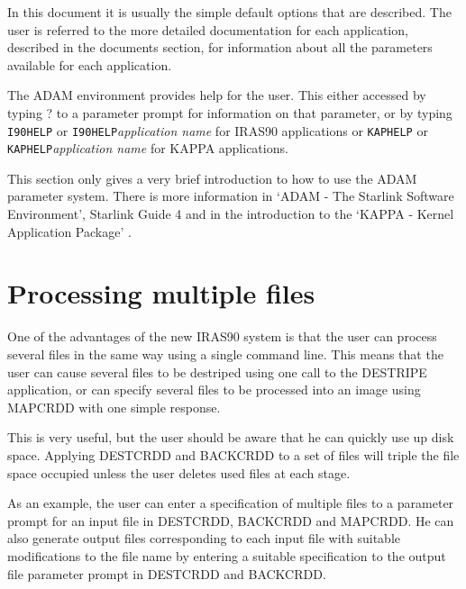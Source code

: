 \documentclass[twoside,11pt]{starlink}
\begin{document}
In this document it is usually the simple default options that are described.
The user is referred to the more detailed documentation for each application,
described in the documents section, for information about all the parameters
available for each application.

The ADAM environment provides help for the user. This either accessed by typing
? to a parameter prompt for information on that parameter, or by typing
\texttt{I90HELP} or \texttt{I90HELP}\textit{application name} for IRAS90 applications or
\texttt{KAPHELP} or \texttt{KAPHELP}\textit{application name} for KAPPA applications.

This section only gives a very brief introduction to how to use the ADAM
parameter system. There is more information in `ADAM - The Starlink Software
Environment', Starlink Guide 4 and in the introduction to the `KAPPA - Kernel
Application Package'
.

\section{Processing multiple files
\label{m:promult}}

One of the advantages of the new IRAS90 system is that the user can process
several  files in the same way using a single command line. This means that
the user can cause several files to be destriped using one call to the DESTRIPE
application, or can specify several files to be processed into an image using
MAPCRDD with one simple response.

This is very useful, but the user should be aware that he can quickly use up
disk space. Applying DESTCRDD and BACKCRDD to a set of files will triple the
file space occupied unless the user deletes used files at each stage.

As an example, the user can enter a specification of multiple files to a
parameter prompt for an input file in DESTCRDD, BACKCRDD and MAPCRDD. He can
also generate output files corresponding to each input file with suitable
modifications to the file name by entering a suitable specification to the
output file parameter prompt in DESTCRDD and BACKCRDD.
\end{document}
